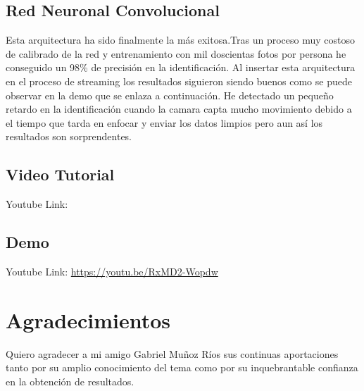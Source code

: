 \documentclass{article}
\begin{document}
\subsection{Red Neuronal Convolucional}
Esta arquitectura ha sido finalmente la más exitosa.\newline Tras un proceso muy costoso de calibrado de la red y entrenamiento con mil doscientas fotos por persona he conseguido un 98\% de precisión en la identificación.\newline
Al insertar esta arquitectura en el proceso de streaming los resultados siguieron siendo buenos como se puede observar en la demo que se enlaza a continuación. He detectado un pequeño retardo en la identificación cuando la camara capta mucho movimiento debido a el tiempo que tarda en enfocar y enviar los datos limpios pero aun así los resultados son sorprendentes.

\subsection{Video Tutorial}
Youtube Link:

\subsection{Demo}
Youtube Link:
\url{https://youtu.be/RxMD2-Wopdw}

\section{Agradecimientos}
Quiero agradecer a mi amigo Gabriel Muñoz Ríos \cite{gabriel_munoz} sus continuas aportaciones tanto por su amplio conocimiento del tema como por su inquebrantable confianza en la obtención de resultados.



\end{document}
